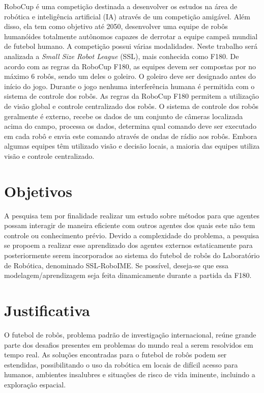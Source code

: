 RoboCup é uma competição destinada a desenvolver os estudos na área de robótica e
inteligência artificial (IA) através de um competição amigável. Além disso, ela tem
como objetivo até 2050, desenvolver uma equipe de robôs humanóides totalmente 
autônomos capazes de derrotar a equipe campeã mundial de futebol humano. A competição
possui várias modalidades. Neste trabalho será analizada a \textit{Small Size Robot League} (SSL), mais 
conhecida como F180. De acordo com as regras da RoboCup F180, as equipes devem ser
compostas por no máximo 6 robôs, sendo um deles o goleiro. O goleiro deve ser 
designado antes do início do jogo. Durante o jogo nenhuma interferência humana é
permitida com o sistema de controle dos robôs. As regras da RoboCup F180 permitem a
utilização de visão global e controle centralizado dos robôs. O sistema de controle
dos robôs geralmente é externo, recebe os dados de um conjunto de câmeras
localizada acima do campo, processa os dados, determina qual comando deve ser executado
em cada robô e envia este comando através de ondas de rádio aos robôs. Embora algumas
equipes têm utilizado visão e decisão locais, a maioria das equipes utiliza visão e
controle centralizado.

\section{Objetivos}

A pesquisa tem por finalidade realizar um estudo sobre métodos para que agentes possam
interagir de maneira eficiente com outros agentes dos quais este não tem controle ou
conhecimento prévio. Devido a complexidade do problema, a pesquisa se propoem a 
realizar esse aprendizado dos agentes externos estaticamente para posteriormente serem
incorporados ao sistema do futebol de robôs do Laboratório de Robótica, denominado
SSL-RoboIME. Se possível, deseja-se que essa modelagem/aprendizagem seja feita
dinamicamente durante a partida da F180.

\section{Justificativa}

O futebol de robôs, problema padrão de investigação internacional, reúne grande parte
dos desafios presentes em problemas do mundo real a serem resolvidos em tempo real.
As soluções encontradas para o futebol de robôs podem ser estendidas, possibilitando
o uso da robótica em locais de difícil acesso para humanos, ambientes insalubres e 
situações de risco de vida iminente, incluindo a exploração espacial.

